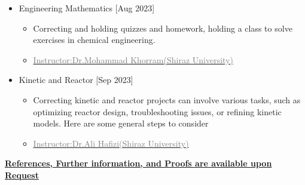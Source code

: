 \documentclass[10pt,a4paper,sans]{moderncv} %
\begin{document}
\begin{itemize}
\begin{itemize}
\begin{itemize}
			\end{itemize}
	 		
				\newline
			

       \vspace{0.5em} 
			
			\item {} Engineering Mathematics  \hfill[Aug 2023]
			\begin{itemize} 
				\item Correcting and holding quizzes and homework, holding a class to solve exercises in chemical engineering.
				\item\href{https://scholar.google.com/citations?user=swfaYtQAAAAJ&hl=en}{\textcolor{gray}{Instructor:Dr.Mohammad Khorram(Shiraz University)}}
				
			\end{itemize}
   
        \vspace{0.5em} 
        
			\item {} Kinetic and Reactor  \hfill[Sep 2023]
			\begin{itemize} 
				\item Correcting kinetic and reactor projects can involve various tasks, such as optimizing reactor design, troubleshooting issues, or refining kinetic models. Here are some general steps to consider
				\item\href{https://scholar.google.com/citations?user=-RmNYeAAAAAJ&hl=en}{\textcolor{gray}{Instructor:Dr.Ali Hafizi(Shiraz University)}}
				
			\end{itemize}

	\end{itemize}
	
	\end{itemize}
	
	\vspace{0.5em}
	

	
	\vspace{1.3 em}
	
	
	
	\centerline{\underline{\textbf{	\faExclamationCircle \hspace{0.5 pt} References, Further information, and Proofs are available upon Request }}}
	
\end{document}
